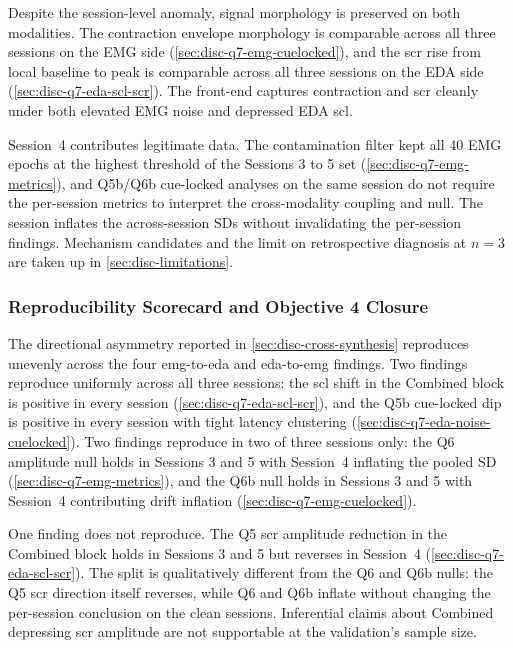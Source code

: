 Despite the session-level anomaly, signal morphology is preserved on both modalities. The contraction envelope morphology is comparable across all three sessions on the EMG side (\autoref{sec:disc-q7-emg-cuelocked}), and the \gls{scr} rise from local baseline to peak is comparable across all three sessions on the EDA side (\autoref{sec:disc-q7-eda-scl-scr}). The front-end captures contraction and \gls{scr} cleanly under both elevated EMG noise and depressed EDA \gls{scl}.

Session~4 contributes legitimate data. The contamination filter kept all 40 EMG epochs at the highest threshold of the Sessions 3 to 5 set (\autoref{sec:disc-q7-emg-metrics}), and Q5b/Q6b cue-locked analyses on the same session do not require the per-session metrics to interpret the cross-modality coupling and null. The session inflates the across-session SDs without invalidating the per-session findings. Mechanism candidates and the limit on retrospective diagnosis at $n = 3$ are taken up in \autoref{sec:disc-limitations}.

\subsubsection{Reproducibility Scorecard and Objective 4 Closure}
\label{sec:disc-rep-synthesis-scorecard}

The directional asymmetry reported in \autoref{sec:disc-cross-synthesis} reproduces unevenly across the four \gls{emg}-to-\gls{eda} and \gls{eda}-to-\gls{emg} findings. Two findings reproduce uniformly across all three sessions: the \gls{scl} shift in the Combined block is positive in every session (\autoref{sec:disc-q7-eda-scl-scr}), and the Q5b cue-locked dip is positive in every session with tight latency clustering (\autoref{sec:disc-q7-eda-noise-cuelocked}). Two findings reproduce in two of three sessions only: the Q6 amplitude null holds in Sessions 3 and 5 with Session~4 inflating the pooled SD (\autoref{sec:disc-q7-emg-metrics}), and the Q6b null holds in Sessions 3 and 5 with Session~4 contributing drift inflation (\autoref{sec:disc-q7-emg-cuelocked}).

One finding does not reproduce. The Q5 \gls{scr} amplitude reduction in the Combined block holds in Sessions 3 and 5 but reverses in Session~4 (\autoref{sec:disc-q7-eda-scl-scr}). The split is qualitatively different from the Q6 and Q6b nulls: the Q5 \gls{scr} direction itself reverses, while Q6 and Q6b inflate without changing the per-session conclusion on the clean sessions. Inferential claims about Combined depressing \gls{scr} amplitude are not supportable at the validation's sample size.

